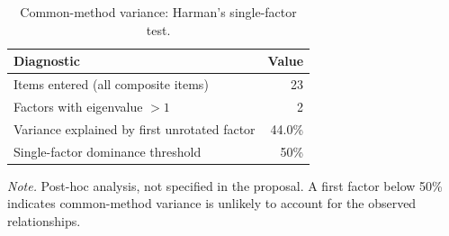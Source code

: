 \begin{table}[htbp]\centering
\caption{Common-method variance: Harman's single-factor test.}\label{tab:cmv}
\begin{tabular}{@{}p{3.6in}r@{}}\toprule
\textbf{Diagnostic} & \textbf{Value} \\ \midrule
Items entered (all composite items) & 23 \\
Factors with eigenvalue $>1$ & 2 \\
Variance explained by first unrotated factor & 44.0\% \\
Single-factor dominance threshold & 50\% \\ \bottomrule
\end{tabular}

\smallskip
\parbox{3.9in}{\footnotesize \textit{Note.} Post-hoc analysis, not specified in the proposal. A first factor below 50\% indicates common-method variance is unlikely to account for the observed relationships.}
\end{table}